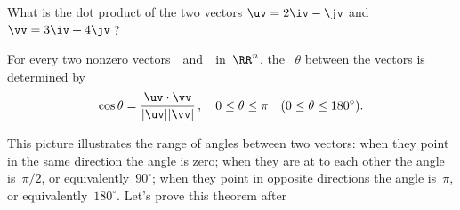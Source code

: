 \begin{activity}
What is the dot product of the two vectors \(\uv=2\iv-\jv\) and \(\vv=3\iv+4\jv\)\,?
\end{activity}





\begin{theorem} \label{thm:anglev}
For every two nonzero vectors~\uv\ and~\vv\ in~\(\RR^n\),  
the ~\(\theta\) between the vectors is determined by 
\begin{equation*}
\cos\theta=\frac{\uv\cdot\vv}{|\uv||\vv|}\,,
\quad 0\leq\theta\leq\pi
\quad (0\leq\theta\leq180^\circ).
\end{equation*}
\end{theorem}

\begin{figure} 
\end{figure}
This picture illustrates the range of angles between two vectors: when they point in the same direction the angle is zero; when they are at  to each other the angle is~\(\pi/2\), or equivalently~\(90^\circ\); when they point in opposite directions the angle is~\(\pi\), or equivalently~\(180^\circ\).
Let's prove this theorem after 



